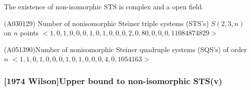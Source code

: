 \begin{frame}
\pause[1]
\begin{block}{}
The existence of non-isomorphic STS is complex and a open field.
\end{block}


\pause[2]
\begin{block}{(A030129) Number of nonisomorphic Steiner triple systems (STS's) $S(2,3,n)$ on $n$ points}
	$<1, 0, 1, 0, 0, 0, 1, 0, 1, 0, 0, 0, 2, 0, 80, 0, 0, 0, 11084874829>$%
\end{block}
\begin{block}{(A051390)Number of nonisomorphic Steiner quadruple systems (SQS's) of order $n$ }
	$<1, 1, 0, 1, 0, 0, 0, 1, 0, 1, 0, 0, 0, 4, 0, 1054163>$%
\end{block}
\end{frame}

\begin{frame}
\frametitle{[1974 Wilson]Upper bound to non-isomorphic STS(v)}

\end{frame}